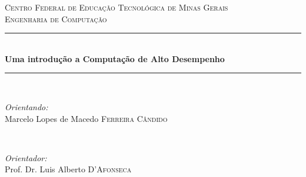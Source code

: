 	\begin{titlepage}
	
	\newcommand{\HRule}{\rule{\linewidth}{0.5mm}} %
	
	\center %
	 
	
	\textsc{\LARGE Centro Federal de Educação Tecnológica de Minas Gerais}\\[3.5cm] %
	\textsc{\Large Engenharia de Computação}\\[3.5cm] %
	
	
	\HRule \\[0.4cm]
	{ \huge \bfseries Uma introdução a Computação de Alto Desempenho}\\[0.2cm] %
	\HRule \\[2.5cm]
	 
	
	\begin{minipage}{0.4\textwidth}
	\begin{flushleft} \large
	\emph{Orientando:}\\ Marcelo Lopes de Macedo \textsc{Ferreira Cândido} %
	\end{flushleft}
	\end{minipage}
	~
	\begin{minipage}{0.4\textwidth}
	\begin{flushright} \large
	\emph{Orientador:} \\
	Prof. Dr. Luis Alberto \textsc{D'Afonseca} %
	\end{flushright}
	\end{minipage}\\[7cm]
	
	

\end{titlepage}
